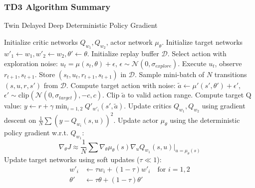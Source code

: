 \documentclass[9pt, aspectratio=169]{beamer}
\begin{document}
\begin{frame}
  \frametitle{TD3 Algorithm Summary}
    \begin{algorithm}[H]
    \captionsetup{font=scriptsize}
    \caption{Twin Delayed Deep Deterministic Policy Gradient}
    \begin{algorithmic}[1]
    \scriptsize
    \STATE Initialize critic networks $Q_{w_1}, Q_{w_2}$, actor network $\mu_{\theta}$.
    \STATE Initialize target networks $w'_1 \leftarrow w_1, w'_2 \leftarrow w_2, \theta' \leftarrow \theta$.
    \STATE Initialize replay buffer $\mathcal{D}$.
        \STATE Select action with exploration noise: $u_t = \mu(s_t, \theta) + \epsilon$, $\epsilon \sim \mathcal{N}(0, \sigma_{explore})$.
        \STATE Execute $u_t$, observe $r_{t+1}, s_{t+1}$. Store $(s_t, u_t, r_{t+1}, s_{t+1})$ in $\mathcal{D}$.
        \STATE Sample mini-batch of $N$ transitions $(s, u, r, s')$ from $\mathcal{D}$.
        \STATE Compute target action with noise: $\tilde{a} \leftarrow \mu'(s', \theta') + \epsilon'$, $\epsilon' \sim \text{clip}(\mathcal{N}(0, \sigma_{target}), -c, c)$. Clip $\tilde{a}$ to valid action range.
        \STATE Compute target Q value: $y \leftarrow r + \gamma \min_{i=1,2} Q'_{w'_i}(s', \tilde{a})$. 
        \STATE Update critics $Q_{w_1}, Q_{w_2}$ using gradient descent on $\frac{1}{N}\sum (y - Q_{w_i}(s, u))^2$.
            \STATE Update actor $\mu_\theta$ using the deterministic policy gradient w.r.t. $Q_{w_1}$:
            \[ \nabla_\theta J \approx \frac{1}{N} \sum \nabla_\theta \mu_\theta(s) \nabla_u Q_{w_1}(s, u)|_{u=\mu_\theta(s)} \]
            \STATE Update target networks using soft updates ($\tau \ll 1$):
            \begin{align*}
                w'_i &\leftarrow \tau w_i + (1-\tau) w'_i \quad \text{for } i=1,2 \\
                \theta' &\leftarrow \tau \theta + (1-\tau) \theta'
            \end{align*}
        \ENDIF
    \ENDFOR
    \end{algorithmic}
    \end{algorithm}
\end{frame}
\end{document}
